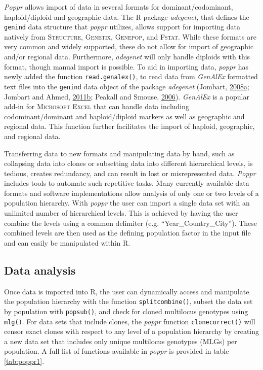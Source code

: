 \documentclass[double,12pt]{beavtex}
\begin{document}
  \emph{Poppr} allows import of data in several formats for
  dominant/codominant, haploid/diploid and geographic data. The R package
  \emph{adegenet}, that defines the \texttt{genind} data structure that
  \emph{poppr} utilizes, allows support for importing data natively from
  \textsc{Structure, Genetix, Genepop}, and \textsc{Fstat}. While these
  formats are very common and widely supported, these do not allow for
  import of geographic and/or regional data. Furthermore, \emph{adegenet}
  will only handle diploids with this format, though manual import is
  possible. To aid in importing data, \emph{poppr} has newly added the
  function \texttt{read.genalex()}, to read data from \emph{GenAlEx}
  formatted text files into the \texttt{genind} data object of the package
  \emph{adegenet} (Jombart,
  \protect\hyperlink{ref-Jombart:2008}{2008}\protect\hyperlink{ref-Jombart:2008}{a};
  Jombart and Ahmed,
  \protect\hyperlink{ref-Jombart:2011}{2011}\protect\hyperlink{ref-Jombart:2011}{b};
  Peakall and Smouse, \protect\hyperlink{ref-Peakall:2006}{2006}).
  \emph{GenAlEx} is a popular add-in for \textsc{Microsoft Excel} that can
  handle data including codominant/dominant and haploid/diploid markers as
  well as geographic and regional data. This function further facilitates
  the import of haploid, geographic, and regional data.
  
  Transferring data to new formats and manipulating data by hand, such as
  collapsing data into clones or subsetting data into different
  hierarchical levels, is tedious, creates redundancy, and can result in
  lost or misrepresented data. \emph{Poppr} includes tools to automate
  such repetitive tasks. Many currently available data formats and
  software implementations allow analysis of only one or two levels of a
  population hierarchy. With \emph{poppr} the user can import a single
  data set with an unlimited number of hierarchical levels. This is
  achieved by having the user combine the levels using a common delimiter
  (e.g. ``Year\_Country\_City''). These combined levels are then used as
  the defining population factor in the input file and can easily be
  manipulated within R.
  
  \subsection{Data analysis}\label{data-analysis}
  
  Once data is imported into R, the user can dynamically access and
  manipulate the population hierarchy with the function
  \texttt{splitcombine()}, subset the data set by population with
  \texttt{popsub()}, and check for cloned multilocus genotypes using
  \texttt{mlg()}. For data sets that include clones, the \emph{poppr}
  function \texttt{clonecorrect()} will censor exact clones with respect
  to any level of a population hierarchy by creating a new data set that
  includes only unique multilocus genotypes (MLGs) per population. A full
  list of functions available in \emph{poppr} is provided in table
  \ref{tab:poppr1}.
  
\end{document}
